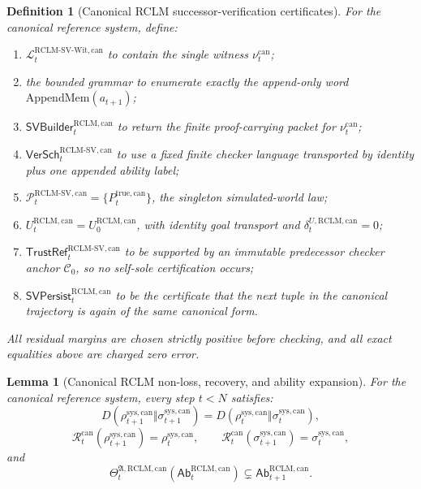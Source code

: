 \documentclass[11pt,a4paper]{article}
\newtheorem{lemma}[theorem]{Lemma}
\newtheorem{definition}[theorem]{Definition}
\newcommand{\Lcal}{\mathcal L}
\newcommand{\Pcal}{\mathcal P}
\newcommand{\RCLM}{\mathrm{RCLM}}
\newcommand{\sys}{\mathrm{sys}}
\newcommand{\true}{\mathrm{true}}
\newcommand{\AppendMem}{\mathrm{AppendMem}}
\begin{document}
\begin{definition}[Canonical RCLM successor-verification certificates]
\label{def:rclm-batch13r-canonical-sv-certificates}
For the canonical reference system, define:
\begin{enumerate}[label=(\roman*),leftmargin=1.5em]
    \item \(\Lcal_t^{\RCLM\text{-}\mathrm{SV\mbox{-}Wit},\mathrm{can}}\) to contain the single witness \(\nu_t^{\mathrm{can}}\);
    \item the bounded grammar to enumerate exactly the append-only word \(\AppendMem(a_{t+1})\);
    \item \(\mathsf{SVBuilder}_t^{\RCLM,\mathrm{can}}\) to return the finite proof-carrying packet for \(\nu_t^{\mathrm{can}}\);
    \item \(\mathsf{VerSch}_t^{\RCLM\text{-}\mathrm{SV},\mathrm{can}}\) to use a fixed finite checker language transported by identity plus one appended ability label;
    \item \(\Pcal_t^{\RCLM\text{-}\mathrm{SV},\mathrm{can}}=\{P_t^{\true,\mathrm{can}}\}\), the singleton simulated-world law;
    \item \(U_t^{\RCLM,\mathrm{can}}=U_0^{\RCLM,\mathrm{can}}\), with identity goal transport and \(\delta_t^{U,\RCLM,\mathrm{can}}=0\);
    \item \(\mathsf{TrustRef}_t^{\RCLM\text{-}\mathrm{SV},\mathrm{can}}\) to be supported by an immutable predecessor checker anchor \(\mathcal C_0\), so no self-sole certification occurs;
    \item \(\mathsf{SVPersist}_t^{\RCLM,\mathrm{can}}\) to be the certificate that the next tuple in the canonical trajectory is again of the same canonical form.
\end{enumerate}
All residual margins are chosen strictly positive before checking, and all exact equalities above are charged zero error.
\end{definition}

\begin{lemma}[Canonical RCLM non-loss, recovery, and ability expansion]
\label{lem:rclm-batch13r-canonical-nonloss-recovery-ability}
For the canonical reference system, every step \(t<N\) satisfies:
\[
D(\rho_{t+1}^{\sys,\mathrm{can}}\Vert\sigma_{t+1}^{\sys,\mathrm{can}})
=
D(\rho_t^{\sys,\mathrm{can}}\Vert\sigma_t^{\sys,\mathrm{can}}),
\]
\[
\mathcal R_t^{\mathrm{can}}(\rho_{t+1}^{\sys,\mathrm{can}})=\rho_t^{\sys,\mathrm{can}},
\qquad
\mathcal R_t^{\mathrm{can}}(\sigma_{t+1}^{\sys,\mathrm{can}})=\sigma_t^{\sys,\mathrm{can}},
\]
and
\[
\Theta_t^{\mathfrak A,\RCLM,\mathrm{can}}
(\mathsf{Ab}_t^{\RCLM,\mathrm{can}})
\subsetneq
\mathsf{Ab}_{t+1}^{\RCLM,\mathrm{can}}.
\]
\end{lemma}
\end{document}
